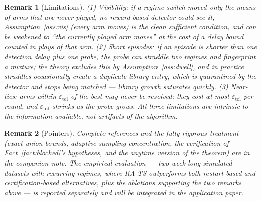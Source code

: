 \documentclass[11pt]{article}
\newtheorem{remark}{Remark}
\newcommand{\etol}{\varepsilon_{\mathrm{tol}}}
\begin{document}
\begin{remark}[Limitations]
\label{rem:limits}
(1) Visibility: if a regime switch moved only the means of arms that are never played, no reward-based detector could see it; Assumption~\ref{ass:vis} (every arm moves) is the clean sufficient condition, and can be weakened to ``the currently played arm moves'' at the cost of a delay bound counted in plays of that arm. (2) Short episodes: if an episode is shorter than one detection delay plus one probe, the probe can straddle two regimes and fingerprint a mixture; the theory excludes this by Assumption~\ref{ass:dwell}, and in practice straddles occasionally create a duplicate library entry, which is quarantined by the detector and stops being matched --- library growth saturates quickly. (3) Near-ties: arms within $\etol$ of the best may never be resolved; they cost at most $\etol$ per round, and $\etol$ shrinks as the probe grows. All three limitations are intrinsic to the information available, not artifacts of the algorithm.
\end{remark}

\begin{remark}[Pointers]
Complete references and the fully rigorous treatment (exact union bounds, adaptive-sampling concentration, the verification of Fact~\ref{fact:blocked}'s hypotheses, and the anytime version of the theorem) are in the companion note. The empirical evaluation --- two week-long simulated datasets with recurring regimes, where RA-TS outperforms both restart-based and certification-based alternatives, plus the ablations supporting the two remarks above --- is reported separately and will be integrated in the application paper.
\end{remark}
\end{document}
